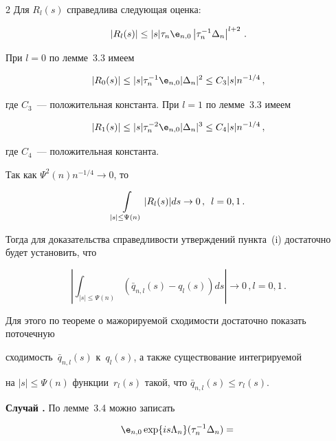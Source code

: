 \begin{multicols}{2}
Для $R_l(s)$ справедлива следующая оценка:


$$


|R_l(s)| \leq |s|\tau_n {\e}_{n,0}\left |\tau_n^{-1}\Delta_n\right|^{l+2}\,.


$$


При $l=0$ по лемме~3.3 имеем


$$


|R_0(s)| \leq |s|\tau_n^{-1}{\e}_{n,0}|\Delta_n|^2 \leq C_3 |s| n^{-1/4}\,,


$$


где $C_3$~--- положительная константа. При $l=1$ по лемме~3.3 имеем


$$


|R_1(s)| \leq |s| \tau_n^{-2} {\e}_{n,0}|\Delta_n|^3 \leq C_4 |s| n^{-1/4}\,,


$$


где $C_4$~--- положительная константа.





Так как $\Psi^2(n) n^{-1/4} \to 0$, то


$$


\int\limits_{|s|\leq\Psi(n)}|R_l(s)|ds \to 0\,,\enskip l=0,1\,.


$$


Тогда для доказательства справедливости утверждений пункта~(i) достаточно будет установить, что


$$


\left|\int_{|s|\leq\Psi(n)}(\bar{q}_{n,l}(s) - q_l(s))ds\right| \to 0\,,  l=0,1\,.


$$


Для этого по теореме о мажорируемой сходимости достаточно показать поточечную 


сходимость~$\bar{q}_{n,l}(s)$ к~$q_l(s)$, а также существование интегрируемой 


на $|s|\leq \Psi(n)$ функции~$r_l(s)$ такой, что $\bar{q}_{n,l}(s)\leq r_l(s)$.





\medskip





\noindent


\textbf{Случай {}.} По лемме~3.4 можно записать


\begin{multline*}


{\e}_{n,0}\exp\{is\Lambda_n\}(\tau_n^{-1}\Delta_n) ={}\\



\end{multline*}
\end{multicols}
